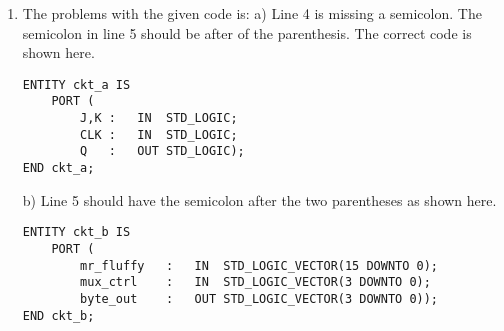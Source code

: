 \begin{enumerate}
\item The problems with the given code is: a) Line 4 is missing a semicolon. The semicolon in line 5 should be after of the parenthesis. The correct code is shown here.

\begin{minipage}{1\linewidth}
	\begin{lstlisting}[]
ENTITY ckt_a IS
	PORT (
		J,K	:	IN	STD_LOGIC;
		CLK	:	IN	STD_LOGIC;
		Q	:	OUT	STD_LOGIC);
END ckt_a;
	\end{lstlisting}
\end{minipage}

b) Line 5 should have the semicolon after the two parentheses as shown here.

\begin{minipage}{1\linewidth}
		\begin{lstlisting}[]
ENTITY ckt_b IS
	PORT (
		mr_fluffy	:	IN	STD_LOGIC_VECTOR(15 DOWNTO 0);
		mux_ctrl	:	IN	STD_LOGIC_VECTOR(3 DOWNTO 0);
		byte_out	:	OUT	STD_LOGIC_VECTOR(3 DOWNTO 0));
END ckt_b;
		\end{lstlisting}
\end{minipage}
\end{enumerate}

